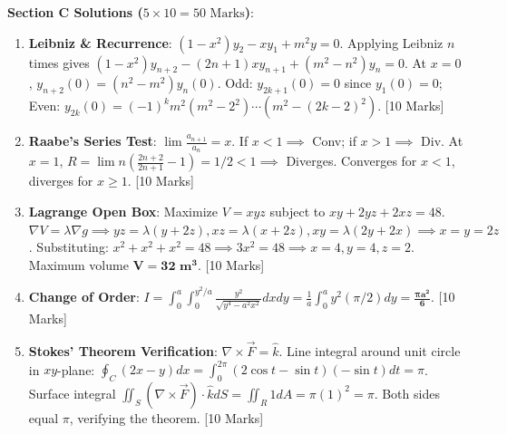 \begin{solutionbox}
\medskip
\noindent\textbf{Section C Solutions ($5 \times 10 = 50\text{ Marks}$)}:
\begin{enumerate}[start=17]
    \item \textbf{Leibniz \& Recurrence}: $(1-x^2)y_2 - xy_1 + m^2 y = 0$. Applying Leibniz $n$ times gives $(1-x^2)y_{n+2} - (2n+1)xy_{n+1} + (m^2-n^2)y_n = 0$. At $x=0$, $y_{n+2}(0) = (n^2-m^2)y_n(0)$. Odd: $y_{2k+1}(0) = 0$ since $y_1(0) = 0$; Even: $y_{2k}(0) = (-1)^k m^2(m^2-2^2)\cdots(m^2-(2k-2)^2)$. [10 Marks]
    \item \textbf{Raabe's Series Test}: $\lim \frac{a_{n+1}}{a_n} = x$. If $x < 1 \implies$ Conv; if $x > 1 \implies$ Div. At $x = 1$, $R = \lim n(\frac{2n+2}{2n+1}-1) = 1/2 < 1 \implies$ Diverges. Converges for $x < 1$, diverges for $x \ge 1$. [10 Marks]
    \item \textbf{Lagrange Open Box}: Maximize $V = xyz$ subject to $xy + 2yz + 2xz = 48$. $\nabla V = \lambda \nabla g \implies yz = \lambda(y+2z), xz = \lambda(x+2z), xy = \lambda(2y+2x) \implies x = y = 2z$. Substituting: $x^2 + x^2 + x^2 = 48 \implies 3x^2 = 48 \implies x = 4, y = 4, z = 2$. Maximum volume $\mathbf{V = 32\text{ m}^3}$. [10 Marks]
    \item \textbf{Change of Order}: $I = \int_0^a \int_0^{y^2/a}\frac{y^2}{\sqrt{y^4-a^2 x^2}}dx dy = \frac{1}{a}\int_0^a y^2 (\pi/2) dy = \mathbf{\frac{\pi a^2}{6}}$. [10 Marks]
    \item \textbf{Stokes' Theorem Verification}: $\nabla\times\vec{F} = \hat{k}$. Line integral around unit circle in $xy$-plane: $\oint_C (2x-y)dx = \int_0^{2\pi}(2\cos t - \sin t)(-\sin t)dt = \pi$. Surface integral $\iint_S (\nabla\times\vec{F})\cdot\hat{k} dS = \iint_R 1 dA = \pi(1)^2 = \pi$. Both sides equal $\pi$, verifying the theorem. [10 Marks]
\end{enumerate}
\end{solutionbox}
